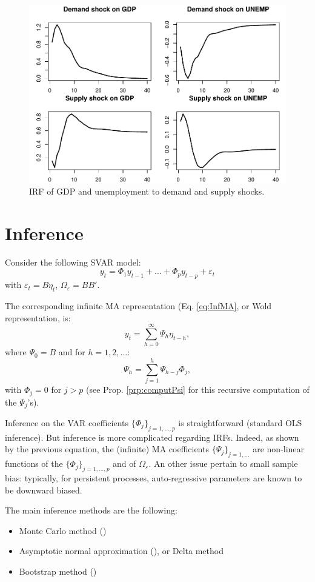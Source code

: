 \documentclass[
  12pt,
]{book}
\providecommand{\tightlist}{%
  \setlength{\itemsep}{0pt}\setlength{\parskip}{0pt}}
\theoremstyle{definition}
\theoremstyle{definition}
\theoremstyle{definition}
\theoremstyle{definition}
\theoremstyle{remark}
\begin{document}
\begin{figure}
\includegraphics[width=0.95\linewidth]{IdentifStructShocks_files/figure-latex/BQ4-1} \caption{IRF of GDP and unemployment to demand and supply shocks.}\label{fig:BQ4}
\end{figure}

\chapter{Inference}\label{Inference}

Consider the following SVAR model:
\[y_t = \Phi_1 y_{t-1} + \dots + \Phi_p y_{t-p} + \varepsilon_t\]
with \(\varepsilon_t=B\eta_t\), \(\Omega_\varepsilon=BB'\).

The corresponding infinite MA representation (Eq. \eqref{eq:InfMA}, or Wold representation, is:
\[
y_t = \sum_{h=0}^\infty\Psi_h \eta_{t-h},
\]
where \(\Psi_0=B\) and for \(h=1,2,\dots\):
\[
\Psi_h = \sum_{j=1}^h\Psi_{h-j}\Phi_j,
\]
with \(\Phi_j=0\) for \(j>p\) (see Prop. \ref{prp:computPsi} for this recursive computation of the \(\Psi_j\)'s).

Inference on the VAR coefficients \(\{\Phi_j\}_{j=1,...,p}\) is straightforward (standard OLS inference). But inference is more complicated regarding IRFs. Indeed, as shown by the previous equation, the (infinite) MA coefficients \(\{\Psi_j\}_{j=1,...}\) are non-linear functions of the \(\{\Phi_j\}_{j=1,...,p}\) and of \(\Omega_\varepsilon\). An other issue pertain to small sample bias: typically, for persistent processes, auto-regressive parameters are known to be downward biased.

The main inference methods are the following:

\begin{itemize}
\tightlist
\item
  Monte Carlo method (\citet{Hamilton_1994})
\item
  Asymptotic normal approximation (\citet{Lutkepohl_1990}), or Delta method
\item
  Bootstrap method (\citet{Kilian_1998})
\end{itemize}
\end{document}
